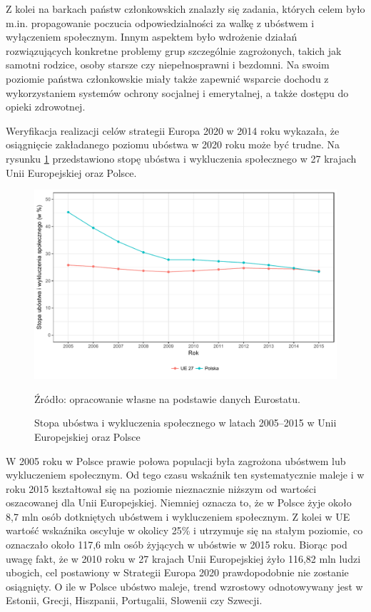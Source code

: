 Z kolei na barkach państw członkowskich znalazły się zadania, których celem było m.in. propagowanie poczucia odpowiedzialności za walkę z ubóstwem i wyłączeniem społecznym. Innym aspektem było wdrożenie działań rozwiązujących konkretne problemy grup szczególnie zagrożonych, takich jak samotni rodzice, osoby starsze czy niepełnosprawni i bezdomni. Na swoim poziomie państwa członkowskie miały także zapewnić wsparcie dochodu z wykorzystaniem systemów ochrony socjalnej i emerytalnej, a także dostępu do opieki zdrowotnej.

Weryfikacja realizacji celów strategii Europa 2020 w 2014 roku wykazała, że osiągnięcie zakładanego poziomu ubóstwa w 2020 roku może być trudne. Na rysunku \ref{fig:europa2020} przedstawiono stopę ubóstwa i wykluczenia społecznego w 27 krajach Unii Europejskiej oraz Polsce.

\begin{figure}[ht]
\includegraphics[width=\textwidth]{01_wykresy/europa2020-1.pdf}
\caption{Stopa ubóstwa i wykluczenia społecznego w latach 2005--2015 w Unii Europejskiej oraz Polsce}
\small{Źródło: opracowanie własne na podstawie danych Eurostatu.}
\label{fig:europa2020}
\end{figure}

W 2005 roku w Polsce prawie połowa populacji była zagrożona ubóstwem lub wykluczeniem społecznym. Od tego czasu wskaźnik ten systematycznie maleje i w roku 2015 kształtował się na poziomie nieznacznie niższym od wartości oszacowanej dla Unii Europejskiej. Niemniej oznacza to, że w Polsce żyje około 8,7 mln osób dotkniętych ubóstwem i wykluczeniem społecznym. Z kolei w UE wartość wskaźnika oscyluje w okolicy 25\% i utrzymuje się na stałym poziomie, co oznaczało około 117,6 mln osób żyjących w ubóstwie w 2015 roku. Biorąc pod uwagę fakt, że w 2010 roku w 27 krajach Unii Europejskiej żyło 116,82 mln ludzi ubogich, cel postawiony w Strategii Europa 2020 prawdopodobnie nie zostanie osiągnięty. O ile w Polsce ubóstwo maleje, trend wzrostowy odnotowywany jest w Estonii, Grecji, Hiszpanii, Portugalii, Słowenii czy Szwecji.

